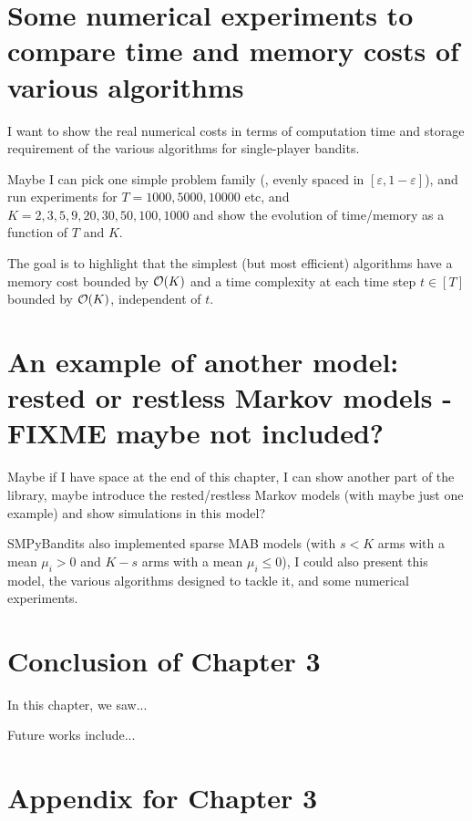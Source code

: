 \section{Some numerical experiments to compare time and memory costs of various algorithms}
\label{sec:3:timeAndMemoryCosts}

I want to show the real numerical costs in terms of computation time and storage requirement of the various algorithms for single-player bandits.

Maybe I can pick one simple problem family (\eg, evenly spaced in $[\varepsilon,1-\varepsilon]$), and run experiments for $T=1000,5000,10000$ etc, and $K=2,3,5,9,20,30,50,100,1000$ and show the evolution of time/memory as a function of $T$ and $K$.

The goal is to highlight that the simplest (but most efficient) algorithms have a memory cost bounded by $\mathop{}\mathopen{}\mathcal{O}\mathopen{}\left(K\right)$ and a time complexity at each time step $t\in[T]$ bounded by $\mathop{}\mathopen{}\mathcal{O}\mathopen{}\left(K\right)$, independent of $t$.


\section{An example of another model: rested or restless Markov models - FIXME maybe not included?}
\label{sec:3:markovModels}

Maybe if I have space at the end of this chapter, I can show another part of the library, maybe introduce the rested/restless Markov models (with maybe just one example) and show simulations in this model?

SMPyBandits also implemented sparse MAB models (with $s<K$ arms with a mean $\mu_i>0$ and $K-s$ arms with a mean $\mu_i \leq 0$), I could also present this model, the various algorithms designed to tackle it, and some numerical experiments.


\section{Conclusion of Chapter 3}
\label{sec:3:conclusion}

In this chapter, we saw...

Future works include...




\section{Appendix for Chapter 3}
\label{sec:3:appendix}

